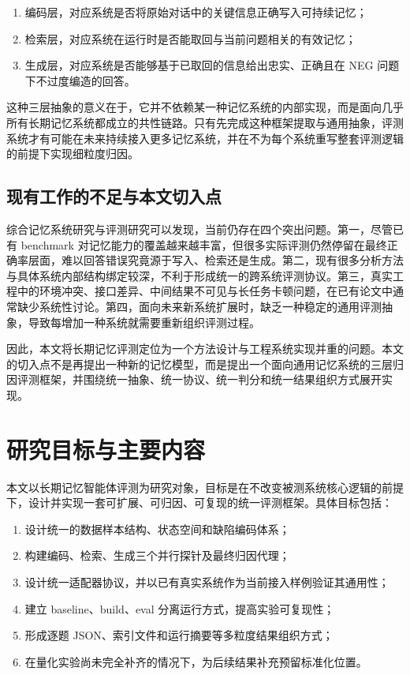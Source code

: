 \begin{enumerate}
    \item 编码层，对应系统是否将原始对话中的关键信息正确写入可持续记忆；
    \item 检索层，对应系统在运行时是否能取回与当前问题相关的有效记忆；
    \item 生成层，对应系统是否能够基于已取回的信息给出忠实、正确且在 NEG 问题下不过度编造的回答。
\end{enumerate}

这种三层抽象的意义在于，它并不依赖某一种记忆系统的内部实现，而是面向几乎所有长期记忆系统都成立的共性链路。只有先完成这种框架提取与通用抽象，评测系统才有可能在未来持续接入更多记忆系统，并在不为每个系统重写整套评测逻辑的前提下实现细粒度归因。

\subsection{现有工作的不足与本文切入点}

综合记忆系统研究与评测研究可以发现，当前仍存在四个突出问题。第一，尽管已有 benchmark 对记忆能力的覆盖越来越丰富，但很多实际评测仍然停留在最终正确率层面，难以回答错误究竟源于写入、检索还是生成。第二，现有很多分析方法与具体系统内部结构绑定较深，不利于形成统一的跨系统评测协议。第三，真实工程中的环境冲突、接口差异、中间结果不可见与长任务卡顿问题，在已有论文中通常缺少系统性讨论。第四，面向未来新系统扩展时，缺乏一种稳定的通用评测抽象，导致每增加一种系统就需要重新组织评测过程。

因此，本文将长期记忆评测定位为一个方法设计与工程系统实现并重的问题。本文的切入点不是再提出一种新的记忆模型，而是提出一个面向通用记忆系统的三层归因评测框架，并围绕统一抽象、统一协议、统一判分和统一结果组织方式展开实现。

\section{研究目标与主要内容}

本文以长期记忆智能体评测为研究对象，目标是在不改变被测系统核心逻辑的前提下，设计并实现一套可扩展、可归因、可复现的统一评测框架。具体目标包括：

\begin{enumerate}
    \item 设计统一的数据样本结构、状态空间和缺陷编码体系；
    \item 构建编码、检索、生成三个并行探针及最终归因代理；
    \item 设计统一适配器协议，并以已有真实系统作为当前接入样例验证其通用性；
    \item 建立 baseline、build、eval 分离运行方式，提高实验可复现性；
    \item 形成逐题 JSON、索引文件和运行摘要等多粒度结果组织方式；
    \item 在量化实验尚未完全补齐的情况下，为后续结果补充预留标准化位置。
\end{enumerate}

